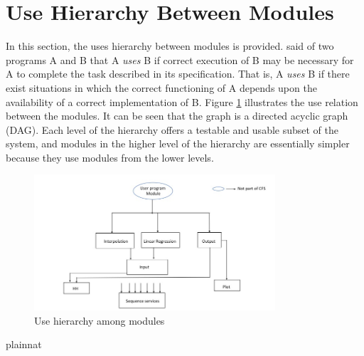 \documentclass[12pt, titlepage]{article}
\begin{document}
\section{Use Hierarchy Between Modules} \label{SecUse}

In this section, the uses hierarchy between modules is
provided. \citet{Parnas1978} said of two programs A and B that A {\em uses} B if
correct execution of B may be necessary for A to complete the task described in
its specification. That is, A {\em uses} B if there exist situations in which
the correct functioning of A depends upon the availability of a correct
implementation of B.  Figure \ref{FigUH} illustrates the use relation between
the modules. It can be seen that the graph is a directed acyclic graph
(DAG). Each level of the hierarchy offers a testable and usable subset of the
system, and modules in the higher level of the hierarchy are essentially simpler
because they use modules from the lower levels.

\begin{figure}[H]
\centering
\includegraphics[width=0.8\textwidth]{UsesHierarchy.jpg}
\caption{Use hierarchy among modules}
\label{FigUH}
\end{figure}




 {plainnat}

\end{document}

